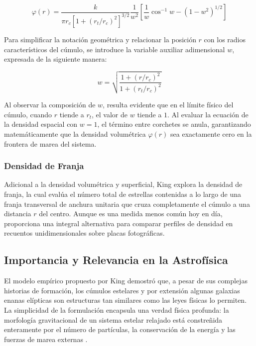             \begin{equation}
                \varphi(r) = \frac{k}{\pi r_c [1 + (r_t/r_c)^2]^{3/2}} 
                \frac{1}{w^2} \left[ \frac{1}{w} \cos^{-1} w - (1 - w^2)^{1/2} 
                \right]
                \label{eq:den_3d}
            \end{equation}

            Para simplificar la notación geométrica y relacionar la posición $r$ 
            con los radios característicos del cúmulo, se introduce la variable 
            auxiliar adimensional $w$, expresada de la siguiente manera:

            $$w = \sqrt{ \frac{1 + (r/r_c)^2}{1 + (r_t/r_c)^2} }$$

            Al observar la composición de $w$, resulta evidente que en el límite 
            físico del cúmulo, cuando $r$ tiende a $r_t$, el valor de $w$ tiende 
            a $1$. Al evaluar la ecuación de la densidad espacial con $w=1$, el 
            término entre corchetes se anula, garantizando matemáticamente que 
            la densidad volumétrica $\varphi(r)$ sea exactamente cero en la 
            frontera de marea del sistema.

        \subsubsection{Densidad de Franja}
            Adicional a la densidad volumétrica y superficial, King explora la 
            densidad de franja, la cual evalúa el número total de estrellas 
            contenidas a lo largo de una franja transversal de anchura unitaria 
            que cruza completamente el cúmulo a una distancia $r$ del centro. 
            Aunque es una medida menos común hoy en día, proporciona una 
            integral alternativa para comparar perfiles de densidad en recuentos 
            unidimensionales sobre placas fotográficas.

    \subsection{Importancia y Relevancia en la Astrofísica}
        El modelo empírico propuesto por King demostró que, a pesar de sus 
        complejas historias de formación, los cúmulos estelares y por extensión 
        algunas galaxias enanas elípticas son estructuras tan similares como las 
        leyes físicas lo permiten. La simplicidad de la formulación encapsula 
        una verdad física profunda: la morfología gravitacional de un sistema 
        estelar relajado está constreñida enteramente por el número de 
        partículas, la conservación de la energía y las fuerzas de marea 
        externas \cite{king1962structure}.

